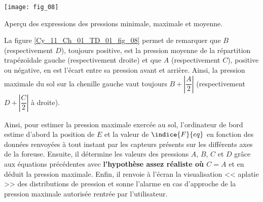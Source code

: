
\begin{marginfigure}
\centering
\texttt{[image: fig\_08]}
\caption{ Aperçu des expressions des pressions 
minimale, maximale et moyenne. \label{Cy_11_Ch_01_TD_01_fig_08}}
\end{marginfigure}
La figure \ref{Cy_11_Ch_01_TD_01_fig_08} permet de remarquer que $B$ 
(respectivement $D$), toujours positive, est la 
pression moyenne de la répartition 
trapézoïdale gauche (respectivement droite) 
et que $A$ (respectivement $C$), positive ou 
négative, en est l’écart entre sa pression 
avant et arrière. Ainsi, la pression maximale 
du sol sur la chenille gauche vaut toujours 
$B+\left|\dfrac{A}{2}\right|$ (respectivement  $D+\left|\dfrac{C}{2}\right|$ à droite).

Ainsi, pour estimer la pression maximale exercée au sol, l’ordinateur de bord estime d’abord la 
position de $E$ et la valeur de $\indice{F}{eq}$ en fonction des données renvoyées à tout instant par les capteurs 
présents sur les différents axes de la foreuse. Ensuite, il détermine les valeurs des pressions $A$, $B$, 
$C$ et $D$ grâce aux équations précédentes avec \textbf{l’hypothèse assez réaliste où $C = A$} et en déduit la 
pression maximale. Enfin, il renvoie à l’écran la visualisation << aplatie >> des distributions de pression 
et sonne l’alarme en cas d’approche de la pression maximale autorisée rentrée par l’utilisateur. 


